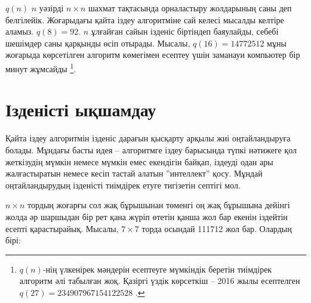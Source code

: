 $q(n)$ $n$ уәзірді $n \times n$ шахмат тақтасында
орналастыру жолдарының саны деп белгілейік.
Жоғарыдағы қайта іздеу алгоритміне сай келесі мысалды келтіре аламыз. $q(8)=92$.
$n$ ұлғайған сайын ізденіс біртіндеп баяулайды,
себебі шешімдер саны  қарқынды өсіп отырады.
Мысалы, $q(16)=14772512$ мұны жоғарыда көрсетілген алгоритм көмегімен 
есептеу үшін заманауи компьютер бір минут жұмсайды
\footnote{$q(n)$-нің үлкенірек мәндерін есептеуге мүмкіндік беретін
тиімдірек алгоритм әлі табылған жоқ. Қазіргі үздік көрсеткіш -- 2016 жылы 
есептелген $q(27)=234907967154122528$ \cite{q27}.}.

\section{Ізденісті ықшамдау}

Қайта іздеу алгоритмін ізденіс дарағын
қысқарту арқылы жиі оңтайландыруға болады.
Мұндағы басты идея -- алгоритмге іздеу барысында түпкі нәтижеге қол жеткізудің мүмкін немесе мүмкін емес екендігін байқап, іздеуді одан ары жалғастыратын немесе кесіп тастай алатын ''интеллект'' қосу.
Мұндай оңтайландырудың ізденісті тиімдірек етуге
тигізетін септігі мол.

$n \times n$ тордың жоғарғы сол жақ бұрышынан
төменгі оң жақ бұрышына дейінгі жолда әр шаршыдан
бір рет қана жүріп өтетін қанша жол бар екенін іздейтін
есепті қарастырайық.
Мысалы, $7 \times 7$ торда осындай 111712 жол бар.
Олардың бірі:

\begin{center}
\end{center}

